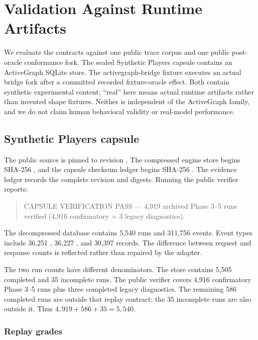 \section{Validation Against Runtime Artifacts}
\label{sec:validation}

We evaluate the contracts against one public trace corpus and one public
post-oracle conformance fork.  The sealed Synthetic Players capsule contains an
ActiveGraph SQLite store.  The activegraph-bridge fixture executes an actual
bridge fork after a committed recorded fixture-oracle effect.  Both contain
synthetic experimental content; ``real'' here means actual runtime artifacts
rather than invented shape fixtures.  Neither is independent of the ActiveGraph
family, and we do not claim human behavioral validity or real-model performance.

\subsection{Synthetic Players capsule}

The public source is pinned to revision .  The compressed
engine store begins SHA-256 , and the capsule checksum
ledger begins SHA-256 .  The evidence ledger records the
complete revision and digests.
Running the public verifier reports:

\begin{quote}
CAPSULE VERIFICATION PASS --- 4,919 archived Phase 3--5 runs verified
(4,916 confirmatory + 3 legacy diagnostics).
\end{quote}

The decompressed database contains 5,540 runs and 311,756 events.  Event types
include 36,251 , 36,227 , and 30,397
 records.  The difference between request and response
counts is reflected rather than repaired by the adapter.

The two run counts have different denominators.  The store contains 5,505
completed and 35 incomplete runs.  The public verifier covers 4,916
confirmatory Phase 3--5 runs plus three completed legacy diagnostics.  The
remaining 586 completed runs are outside that replay contract; the 35
incomplete runs are also outside it.  Thus $4{,}919+586+35=5{,}540$.

\subsubsection{Replay grades}

